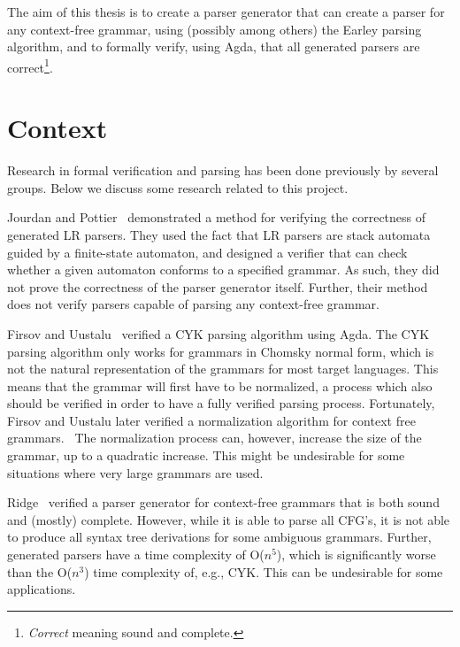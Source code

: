 \documentclass{article}
\begin{document}
	The aim of this thesis is to create a parser generator that can create a
	parser for any context-free grammar, using (possibly among others) the
	Earley parsing algorithm, and to formally verify, using Agda, that all
	generated parsers are correct\footnote{\emph{Correct} meaning sound and complete.}.


\section{Context}

	Research in formal verification and parsing has been done previously by
	several groups. Below we discuss some research related to this project.

	Jourdan and Pottier~\cite{Jourdan} demonstrated
	a method for verifying the
	correctness of generated LR parsers. They used the fact that LR parsers are
	stack automata guided by a finite-state automaton, and designed a verifier
	that can check whether a given automaton conforms to a specified grammar.
	As such, they did not prove the correctness of the parser generator itself.
	Further, their method does not verify parsers capable of parsing any context-free
	grammar.

	Firsov and Uustalu~\cite{Firsov14} verified a CYK parsing algorithm using
	Agda. The CYK parsing algorithm only works for grammars in Chomsky normal
	form, which is not the natural representation of the grammars
	for most target languages. This
	means that the grammar will first have to be normalized, a process which
	also should be verified in order to have a fully verified parsing process.
	Fortunately, Firsov and Uustalu later verified a normalization algorithm
	for context free grammars.~\cite{Firsov15} The normalization process can,
	however, increase the size of the grammar, up to a quadratic increase. This
	might be undesirable for some situations where very large grammars are
	used.

	Ridge~\cite{ridge11} verified a parser generator for context-free grammars
	that is both sound and (mostly) complete. However, while it is able to
	parse all CFG's, it is not able to produce all syntax tree derivations for
	some ambiguous grammars. Further, generated parsers have a time complexity
	of O($n^5$), which is significantly worse than the O($n^3$) time
	complexity of, e.g., CYK. This can be undesirable for some applications.
\end{document}
